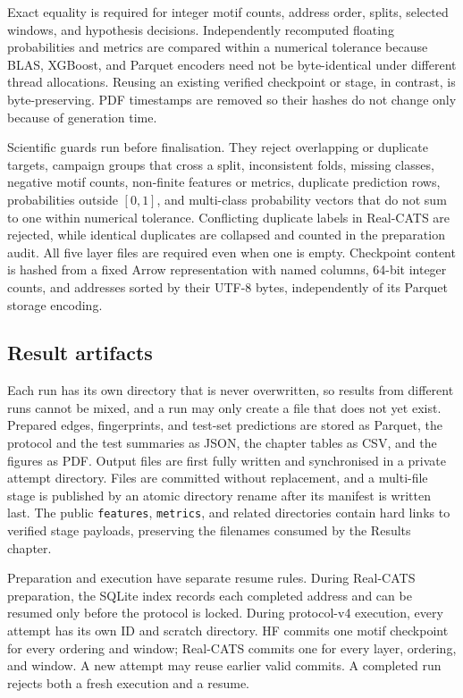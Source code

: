 \documentclass{thesisclass}
\begin{document}
Exact equality is required for integer motif counts, address order, splits,
selected windows, and hypothesis decisions. Independently recomputed floating
probabilities and metrics are compared within a numerical tolerance because
BLAS, XGBoost, and Parquet encoders need not be byte-identical under different
thread allocations. Reusing an existing verified checkpoint or stage, in
contrast, is byte-preserving. PDF timestamps are removed so their hashes do not
change only because of generation time.

Scientific guards run before finalisation. They reject overlapping or duplicate
targets, campaign groups that cross a split, inconsistent folds, missing
classes, negative motif counts, non-finite features or metrics, duplicate
prediction rows, probabilities outside $[0,1]$, and multi-class probability
vectors that do not sum to one within numerical tolerance. Conflicting
duplicate labels in Real-CATS are rejected, while identical duplicates are
collapsed and counted in the preparation audit. All five layer files are
required even when one is empty. Checkpoint content is hashed from a fixed
Arrow representation with named columns, 64-bit integer counts, and addresses
sorted by their UTF-8 bytes, independently of its Parquet storage encoding.

\subsection{Result artifacts}

Each run has its own directory that is never overwritten, so results from
different runs cannot be mixed, and a run may only create a file that does not yet
exist. Prepared edges, fingerprints, and test-set predictions are stored as
Parquet, the protocol and the test summaries as JSON, the chapter tables as CSV,
and the figures as PDF. Output files are first fully written and synchronised in
a private attempt directory. Files are committed without replacement, and a
multi-file stage is published by an atomic directory rename after its manifest is
written last. The public \texttt{features}, \texttt{metrics}, and related
directories contain hard links to verified stage payloads, preserving the
filenames consumed by the Results chapter.

Preparation and execution have separate resume rules. During Real-CATS
preparation, the SQLite index records each completed address and can be resumed
only before the protocol is locked. During protocol-v4 execution, every attempt
has its own ID and scratch directory. HF commits one motif checkpoint for every
ordering and window; Real-CATS commits one for every layer, ordering, and
window. A new attempt may reuse earlier valid commits. A completed run rejects
both a fresh execution and a resume.
\end{document}
